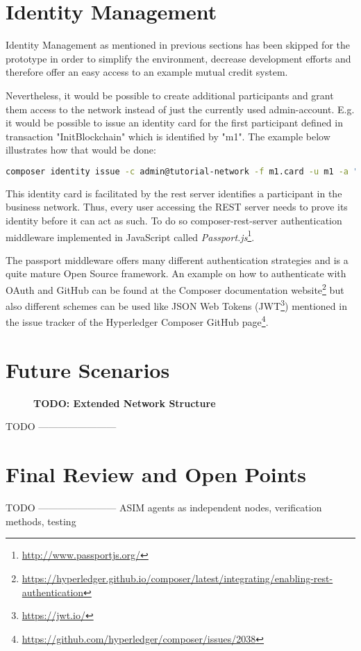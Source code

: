 \section{Identity Management}
\label{sec:id-management}

Identity Management as mentioned in previous sections has been skipped for the prototype in order to simplify the environment, decrease development efforts and therefore offer an easy access to an example mutual credit system.

Nevertheless, it would be possible to create additional participants and grant them access to the network instead of just the currently used admin-account. E.g. it would be possible to issue an identity card for the first participant defined in transaction "InitBlockchain" which is identified by "m1". The example below illustrates how that would be done:

\begin{lstlisting}[language=bash]
	composer identity issue -c admin@tutorial-network -f m1.card -u m1 -a "resource:net.sardex.interlace.Individual#m1" -x true 
\end{lstlisting}

This identity card is facilitated by the rest server identifies a participant in the business network. Thus, every user accessing the REST server needs to prove its identity before it can act as such. To do so composer-rest-server authentication middleware implemented in JavaScript called \textit{Passport.js}\footnote{\url{http://www.passportjs.org/}}.

The passport middleware offers many different authentication strategies and is a quite mature Open Source framework. An example on how to authenticate with OAuth and GitHub can be found at the Composer documentation website\footnote{\url{https://hyperledger.github.io/composer/latest/integrating/enabling-rest-authentication}} but also different schemes can be used like JSON Web Tokens (JWT\footnote{\url{https://jwt.io/}}) mentioned in the issue tracker of the Hyperledger Composer GitHub page\footnote{\url{https://github.com/hyperledger/composer/issues/2038}}.

\section{Future Scenarios}
\label{sec:future-scene}

\begin{figure}[htbp]
  \centering
  \caption{\bf\small TODO: Extended Network Structure}
  \label{fig:prototype-net-ext}
\end{figure}

TODO ------------------------

\section{Final Review and Open Points}

TODO ------------------------
ASIM agents as independent nodes, verification methods, testing 